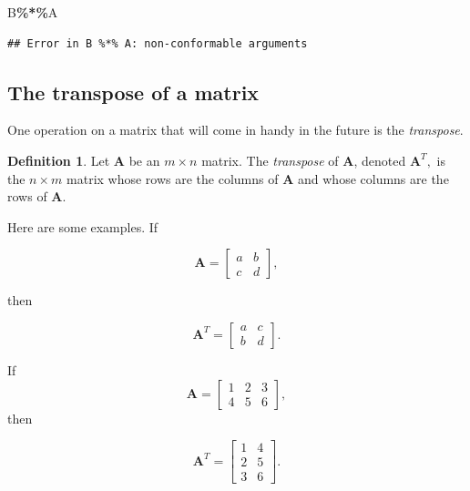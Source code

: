 \documentclass[
]{book}
\newenvironment{Shaded}{\begin{snugshade}}{\end{snugshade}}
\newcommand{\NormalTok}[1]{#1}
\newcommand{\SpecialCharTok}[1]{\textcolor[rgb]{0.81,0.36,0.00}{\textbf{#1}}}
\theoremstyle{definition}
\newtheorem{definition}{Definition}[chapter]
\theoremstyle{definition}
\theoremstyle{definition}
\theoremstyle{definition}
\theoremstyle{remark}
\begin{document}
\begin{Shaded}
\begin{Highlighting}[]
\NormalTok{B}\SpecialCharTok{\%*\%}\NormalTok{A}
\end{Highlighting}
\end{Shaded}

\begin{verbatim}
## Error in B %*% A: non-conformable arguments
\end{verbatim}

\subsection*{The transpose of a matrix}\label{the-transpose-of-a-matrix}

One operation on a matrix that will come in handy in the future is the \emph{transpose}.

\begin{defbox}

\begin{definition}
Let \(\mathbf{A}\) be an \(m\times n\) matrix. The \emph{transpose} of \(\mathbf{A}\), denoted \(\mathbf{A}^T,\) is the \(n\times m\) matrix whose rows are the columns of \(\mathbf{A}\) and whose columns are the rows of \(\mathbf{A}\).
\end{definition}

\end{defbox}

Here are some examples. If

\[\mathbf{A}=\begin{bmatrix} a & b\\c & d\end{bmatrix},\]

then

\[\mathbf{A}^T=\begin{bmatrix} a& c\\b& d\end{bmatrix}.\]

If
\[\mathbf{A}=\begin{bmatrix}1 & 2 & 3\\4 & 5 & 6\end{bmatrix},\]
then

\[\mathbf{A}^T=\begin{bmatrix} 1 & 4\\2 & 5\\3 & 6\end{bmatrix}.\]
\end{document}
